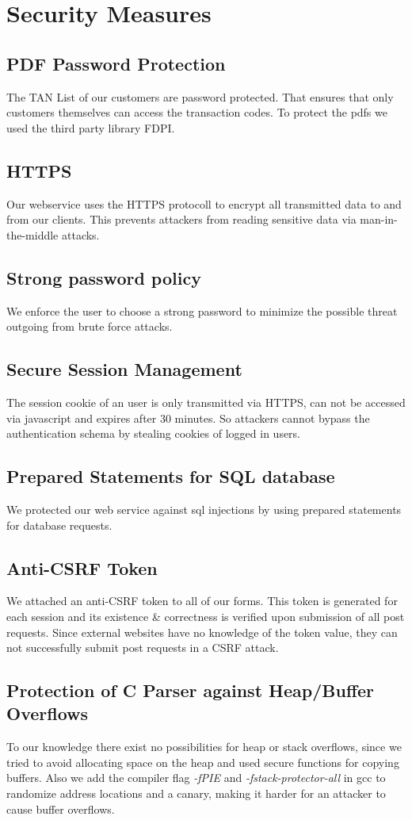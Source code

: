 \chapter{Security Measures}

\section{PDF Password Protection}
The TAN List of our customers are password protected. That ensures that only customers themselves can access the transaction codes. To protect the pdfs we used the third party library FDPI.
\section{HTTPS}
Our webservice uses the HTTPS protocoll to encrypt all transmitted data to and from our clients.
This prevents attackers from reading sensitive data via man-in-the-middle attacks.
\section{Strong password policy}
We enforce the user to choose a strong password to minimize the possible threat outgoing from brute force attacks.
\section{Secure Session Management}
The session cookie of an user is only transmitted via HTTPS, can not be accessed via javascript and expires after 30 minutes. So attackers cannot bypass the authentication schema by stealing cookies of logged in users.
\section{Prepared Statements for SQL database}
We protected our web service against sql injections by using prepared statements for database requests.
\section{Anti-CSRF Token}
We attached an anti-CSRF token to all of our forms. This token is generated for each session and its existence \& correctness is verified upon submission of all post requests. Since external websites have no knowledge of the token value, they can not successfully submit post requests in a CSRF attack.
\section{Protection of C Parser against Heap/Buffer Overflows}
To our knowledge there exist no possibilities for heap or stack overflows, since we tried to avoid allocating space on the heap and used secure functions for copying buffers. Also we add the compiler flag \textit{-fPIE} and \textit{-fstack-protector-all} in gcc to randomize address locations and a canary, making it harder for an attacker to cause buffer overflows.
